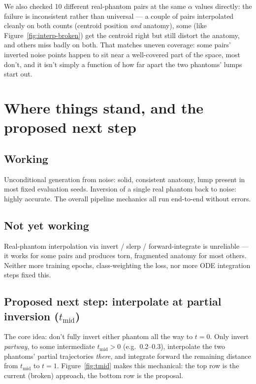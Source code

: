 \documentclass[11pt]{article}
\newcommand{\hsec}[1]{\section*{\color{hdrblue}#1}}
\newcommand{\hsub}[1]{\subsection*{#1}}
\begin{document}
We also checked 10 different real-phantom pairs at the same $\alpha$ values directly: the
failure is inconsistent rather than universal --- a couple of pairs interpolated cleanly on
both counts (centroid position \emph{and} anatomy), some (like Figure~\ref{fig:interp-broken})
get the centroid right but still distort the anatomy, and others miss badly on both. That
matches uneven coverage: some pairs' inverted noise points happen to sit near a well-covered
part of the space, most don't, and it isn't simply a function of how far apart the two
phantoms' lumps start out.

\hsec{Where things stand, and the proposed next step}

\hsub{Working}
Unconditional generation from noise: solid, consistent anatomy, lump present in most fixed
evaluation seeds. Inversion of a single real phantom back to noise: highly accurate. The
overall pipeline mechanics all run end-to-end without errors.

\hsub{Not yet working}
Real-phantom interpolation via invert / slerp / forward-integrate is unreliable --- it works
for some pairs and produces torn, fragmented anatomy for most others. Neither more training
epochs, class-weighting the loss, nor more ODE integration steps fixed this.

\hsub{Proposed next step: interpolate at partial inversion ($t_{\text{mid}}$)}
The core idea: don't fully invert either phantom all the way to $t=0$. Only invert
\emph{partway}, to some intermediate $t_{\text{mid}} > 0$ (e.g.\ 0.2--0.3), interpolate the two
phantoms' partial trajectories \emph{there}, and integrate forward the remaining distance from
$t_{\text{mid}}$ to $t=1$. Figure~\ref{fig:tmid} makes this mechanical: the top row is the
current (broken) approach, the bottom row is the proposal.
\end{document}
